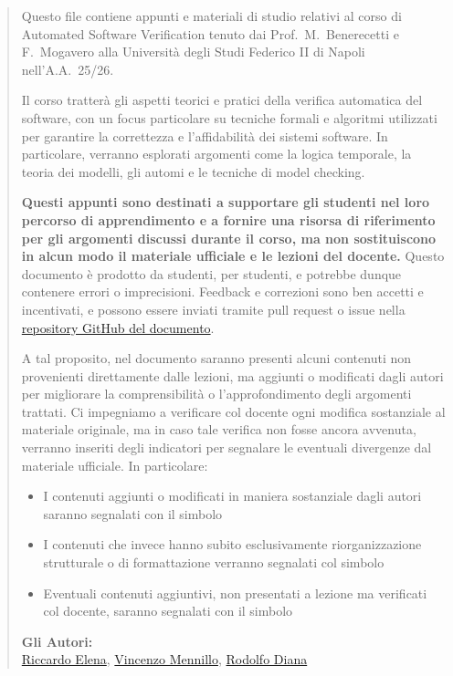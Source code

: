 \begin{abstract}
  Questo file contiene appunti e materiali di studio relativi al corso di Automated Software Verification tenuto dai Prof.~M.~Benerecetti e F.~Mogavero alla Università degli Studi Federico II di Napoli nell'A.A.~25/26.
  
  Il corso tratterà gli aspetti teorici e pratici della verifica automatica del software, con un focus particolare su tecniche formali e algoritmi utilizzati per garantire la correttezza e l'affidabilità dei sistemi software.
  In particolare, verranno esplorati argomenti come la logica temporale, la teoria dei modelli, gli automi e le tecniche di model checking.

  \textbf{Questi appunti sono destinati a supportare gli studenti nel loro percorso di apprendimento e a fornire una risorsa di riferimento per gli argomenti discussi durante il corso, ma non sostituiscono in alcun modo il materiale ufficiale e le lezioni del docente.}
  Questo documento è prodotto da studenti, per studenti, e potrebbe dunque contenere errori o imprecisioni. Feedback e correzioni sono ben accetti e incentivati, e possono essere inviati tramite pull request o issue nella \href{https://github.com/RiccardoElena/ASV_Notes}{repository GitHub del documento}.

  A tal proposito, nel documento saranno presenti alcuni contenuti non provenienti direttamente dalle lezioni, ma aggiunti o modificati dagli autori per migliorare la comprensibilità o l'approfondimento degli argomenti trattati.
  Ci impegniamo a verificare col docente ogni modifica sostanziale al materiale originale, ma in caso tale verifica non fosse ancora avvenuta, verranno inseriti degli indicatori per segnalare le eventuali divergenze dal materiale ufficiale.
  In particolare:
  \begin{itemize}
    \item I contenuti aggiunti o modificati in maniera sostanziale dagli autori saranno segnalati con il simbolo \warningsymbol{}
    \item I contenuti che invece hanno subito esclusivamente riorganizzazione strutturale o di formattazione verranno segnalati col simbolo \infosymbol{}
    \item Eventuali contenuti aggiuntivi, non presentati a lezione ma verificati col docente, saranno segnalati con il simbolo \extrasymbol{}
  \end{itemize}
  
  \begin{flushright}
    \vspace{2cm}
    \textbf{Gli Autori:}\\
    \href{https://github.com/RiccardoElena}{Riccardo Elena}, \href{https://github.com/ViMen23}{Vincenzo Mennillo}, \href{https://github.com/PrimeLogic0}{Rodolfo Diana} \\
  \end{flushright}
\end{abstract}